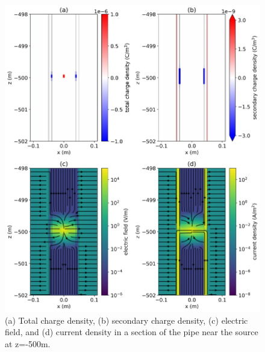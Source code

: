 \begin{figure}
    \begin{center}
    \includegraphics[width=0.7\columnwidth]{figures/kaufman_zones.png}
    \end{center}
\caption{(a) Total charge density, (b) secondary charge density, (c) electric field, and (d) current density in a section of the pipe near the source at z=-500m.}
\label{fig:kaufman_zones}
\end{figure}
